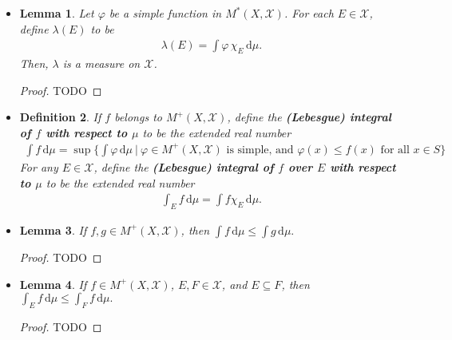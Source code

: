 \documentclass[10pt]{article}
\newtheorem{lemma}{Lemma}
\newtheorem{definition}[lemma]{Definition}
\newcommand{\dee}{\mathrm{d}}
\newcommand{\mcal}[1]{\mathcal{#1}}
\begin{document}
\begin{itemize}
  \begin{proof}
    TODO
  \end{proof}

  \item \begin{lemma}
  Let $\varphi$ be a simple function in $M^*(X, \mcal{X})$. For each $E \in \mcal{X}$, define $\lambda(E)$ to be
  \begin{align*}
    \lambda(E) = \int \varphi\, \chi_{E}\, \dee\mu.
  \end{align*}
  Then, $\lambda$ is a measure on $\mcal{X}$.
  \end{lemma}

  \begin{proof}
    TODO
  \end{proof}

  \item \begin{definition}
    If $f$ belongs to $M^+(X, \mcal{X})$, define the {\bf (Lebesgue) integral of $f$ with respect to $\mu$} to be the extended real number
    \begin{align*}
      \int f\, \dee\mu = \sup \bigg\{ \int \varphi\, \dee\mu\ \bigg| \ \varphi \in M^+(X,\mcal{X})\mbox{ is simple, and } \varphi(x) \leq f(x)\mbox{ for all }x \in S \bigg\}
    \end{align*}
    For any $E \in \mcal{X}$, define the {\bf (Lebesgue) integral of $f$ over $E$ with respect to $\mu$} to be the extended real number
    \begin{align*}
        \int_E f\, \dee \mu = \int f\chi_E\, \dee\mu.
    \end{align*}
  \end{definition}

  \item \begin{lemma}
    If $f,g \in M^+(X,\mcal{X})$, then
    $\int f\, \dee\mu \leq \int g\, \dee\mu.$    
  \end{lemma}

  \begin{proof}
    TODO
  \end{proof}

  \item \begin{lemma}
    If $f \in M^+(X,\mcal{X})$, $E,F \in \mcal{X}$, and $E \subseteq F$, then    
    $\int_E f\, \dee\mu \leq \int_F f\, \dee\mu.$    
  \end{lemma}

  \begin{proof}
    TODO
  \end{proof}


\end{itemize}
\end{document}
